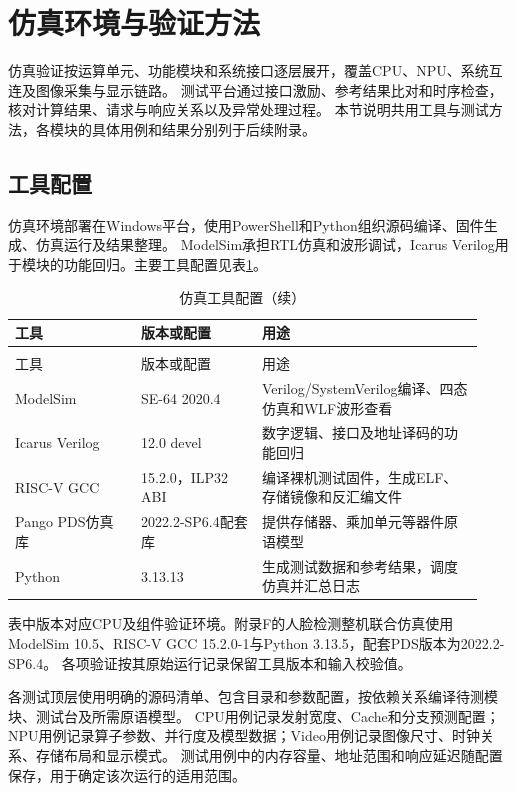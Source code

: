 \section{仿真环境与验证方法}

仿真验证按运算单元、功能模块和系统接口逐层展开，覆盖CPU、NPU、系统互连及图像采集与显示链路。
测试平台通过接口激励、参考结果比对和时序检查，核对计算结果、请求与响应关系以及异常处理过程。
本节说明共用工具与测试方法，各模块的具体用例和结果分别列于后续附录。

\subsection{工具配置}

仿真环境部署在Windows平台，使用PowerShell和Python组织源码编译、固件生成、仿真运行及结果整理。
ModelSim承担RTL仿真和波形调试，Icarus Verilog用于模块的功能回归。主要工具配置见表\ref{tbl:simulation-tools}。

\begin{reporttable}
\begin{longtable}{@{}p{0.25\linewidth}p{0.24\linewidth}p{0.44\linewidth}@{}}
\caption{仿真工具配置}\label{tbl:simulation-tools}\\
\toprule
工具 & 版本或配置 & 用途 \\
\midrule
\endfirsthead
\caption[]{仿真工具配置（续）}\\
\toprule
工具 & 版本或配置 & 用途 \\
\midrule
\endhead
\bottomrule
\endfoot
ModelSim & SE-64 2020.4 & Verilog/SystemVerilog编译、四态仿真和WLF波形查看 \\
Icarus Verilog & 12.0 devel & 数字逻辑、接口及地址译码的功能回归 \\
RISC-V GCC & 15.2.0，ILP32 ABI & 编译裸机测试固件，生成ELF、存储镜像和反汇编文件 \\
Pango PDS仿真库 & 2022.2-SP6.4配套库 & 提供存储器、乘加单元等器件原语模型 \\
Python & 3.13.13 & 生成测试数据和参考结果，调度仿真并汇总日志 \\
\end{longtable}
\end{reporttable}

表中版本对应CPU及组件验证环境。附录F的人脸检测整机联合仿真使用ModelSim 10.5、RISC-V GCC 15.2.0-1与Python 3.13.5，配套PDS版本为2022.2-SP6.4。
各项验证按其原始运行记录保留工具版本和输入校验值。

各测试顶层使用明确的源码清单、包含目录和参数配置，按依赖关系编译待测模块、测试台及所需原语模型。
CPU用例记录发射宽度、Cache和分支预测配置；NPU用例记录算子参数、并行度及模型数据；Video用例记录图像尺寸、时钟关系、存储布局和显示模式。
测试用例中的内存容量、地址范围和响应延迟随配置保存，用于确定该次运行的适用范围。

